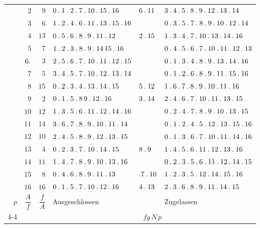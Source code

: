 \begin{longtable}{r|r|r|p{113pt}|p{29pt}|p{120pt}}
 & $2$ & $9$ & $0\pdot 1\pdot 2\pdot 7\pdot 10\pdot 15\pdot 16$ & $6\pdot 11$ & $3\pdot 4\pdot 5\pdot 8\pdot 9\pdot 12\pdot 13\pdot 14$\\
 & $3$ & $6$ & $1\pdot 2\pdot 4\pdot 6\pdot 11\pdot 13\pdot 15\pdot 16$ &  & $0\pdot 3\pdot 5\pdot 7\pdot 8\pdot 9\pdot 10\pdot 12\pdot 14$\\
 & $4$ & $13$ & $0\pdot 5\pdot 6\pdot 8\pdot 9\pdot 11\pdot 12$ & $2\pdot 15$ & $1\pdot 3\pdot 4\pdot 7\pdot 10\pdot 13\pdot 14\pdot 16$\\
 & $5$ & $7$ & $1\pdot 2\pdot 3\pdot 8\pdot 9\pdot 14\,15\pdot 16$ &  & $0\pdot 4\pdot 5\pdot 6\pdot 7\pdot 10\pdot 11\pdot 12\pdot 13$\\
 & $6\pdot $ & $3$ & $2\pdot 5\pdot 6\pdot 7\pdot 10\pdot 11\pdot 12\pdot 15$ &  & $0\pdot 1\pdot 3\pdot 4\pdot 8\pdot 9\pdot 13\pdot 14\pdot 16$\\
 & $7$ & $5$ & $3\pdot 4\pdot 5\pdot 7\pdot 10\pdot 12\pdot 13\pdot 14$ &  & $0\pdot 1\pdot 2\pdot 6\pdot 8\pdot 9\pdot 11\pdot 15\pdot 16$\\
 & $8$ & $15$ & $0\pdot 2\pdot 3\pdot 4\pdot 13\pdot 14\pdot 15$ & $5\pdot 12$ & $1\pdot 6\pdot 7\pdot 8\pdot 9\pdot 10\pdot 11\pdot 16$\\
 & $9$ & $2$ & $0\pdot 1\pdot 5\pdot 8\,9\pdot 12\pdot 16$ & $3\pdot 14$ & $2\pdot 4\pdot 6\pdot 7\pdot 10\pdot 11\pdot 13\pdot 15$\\
 & $10$ & $12$ & $1\pdot 3\pdot 5\pdot 6\pdot 11\pdot 12\pdot 14\pdot 16$ &  & $0\pdot 2\pdot 4\pdot 7\pdot 8\pdot 9\pdot 10\pdot 13\pdot 15$\\
 & $11$ & $14$ & $3\pdot 6\pdot 7\pdot 8\pdot 9\pdot 10\pdot 11\pdot 14$ &  & $0\pdot 1\pdot 2\pdot 4\pdot 5\pdot 12\pdot 13\pdot 15\pdot 16$\\
 & $12$ & $10$ & $2\pdot 4\pdot 5\pdot 8\pdot 9\pdot 12\pdot 13\pdot 15$ &  & $0\pdot 1\pdot 3\pdot 6\pdot 7\pdot 10\pdot 11\pdot 14\pdot 16$\\
 & $13$ & $4$ & $0\pdot 2\pdot 3\pdot 7\pdot 10\pdot 14\pdot 15$ & $8\pdot 9$ & $1\pdot 4\pdot 5\pdot 6\pdot 11\pdot 12\pdot 13\pdot 16$\\
 & $14$ & $11$ & $1\pdot 4\pdot 7\pdot 8\pdot 9\pdot 10\pdot 13\pdot 16$ &  & $0\pdot 2\pdot 3\pdot 5\pdot 6\pdot 11\pdot 12\pdot 14\pdot 15$\\
 & $15$ & $8$ & $0\pdot 4\pdot 6\pdot 8\pdot 9\pdot 11\pdot 13$ & $\pdot 7\pdot 10$ & $1\pdot 2\pdot 3\pdot 5\pdot 12\pdot 14\pdot 15\pdot 16$\\
 & $16$ & $16$ & $0\pdot 1\pdot 5\pdot 7\pdot 10\pdot 12\pdot 16$ & $4\pdot 13$ & $2\pdot 3\pdot 6\pdot 8\pdot 9\pdot 11\pdot 14\pdot 15$\\
\hline
$p$ & $\dfrac{A}{f}$ & $\dfrac{f}{A}$ & Ausgeschlossen & & Zugelassen\\\cline{4-4}\cline{6-6}
& & & \multicolumn{3}{c}{$fg\,N\,p$}\\
\end{longtable}\endgroup
